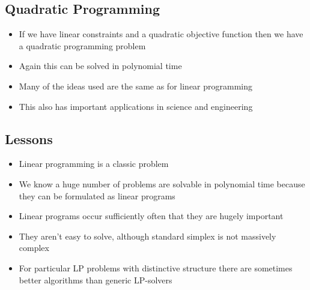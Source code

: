 \begin{slide}
\section{Quadratic Programming}

\begin{PauseHighLight}
  \begin{itemize}
  \item If we have linear constraints and a quadratic objective function
    then we have a quadratic programming problem\pause
  \item Again this can be solved in polynomial time\pause
  \item Many of the ideas used are the same as for linear programming\pause
  \item This also has important applications in science and
    engineering\pause
  \end{itemize}
\end{PauseHighLight}

\end{slide}


\begin{slide}
\section{Lessons}

\begin{PauseHighLight}
  \begin{itemize}
  \item Linear programming is a classic problem\pause
  \item We know a huge number of problems are solvable in polynomial
    time because they can be formulated as linear programs\pause
  \item Linear programs occur sufficiently often that they are hugely
    important\pause
  \item They aren't easy to solve, although standard simplex is not
    massively complex\pause
  \item For particular LP problems with distinctive structure there are
    sometimes better algorithms than generic LP-solvers\pause
  \end{itemize}
\end{PauseHighLight}

\end{slide}
